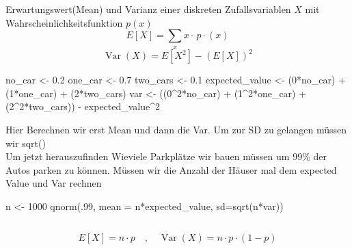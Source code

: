 \newpage


\section{}
\subsection{}
Erwartungswert(Mean) und Varianz einer diskreten Zufallsvariablen $X$ mit Wahrscheinlichkeitsfunktion $p(x)$
\large{
\[
E[X] = \sum_{x} x \cdot\, p\cdot(x)
\]
\[
\operatorname{Var}(X) = E\left[X^2\right] - \left(E\left[X\right]\right)^2
\]
}
\normalsize
\begin{rcode}{1}
no_car <- 0.2
one_car <- 0.7
two_cars <- 0.1
expected_value <- (0*no_car) + (1*one_car) + (2*two_cars)
var <- ((0^2*no_car) + (1^2*one_car) + (2^2*two_cars)) - expected_value^2  
\end{rcode}
Hier Berechnen wir erst Mean und dann die Var. Um zur SD zu gelangen müssen wir sqrt()\\
Um jetzt herauszufinden Wieviele Parkplätze wir bauen müssen um 99\% der Autos parken zu können. Müssen wir die Anzahl der Häuser mal dem expected Value und Var rechnen
\begin{rcode}{1}
n <- 1000
qnorm(.99, mean = n*expected_value, sd=sqrt(n*var))
\end{rcode}
\subsection{}
\large
\[
E[X] = n \cdot p \quad, \quad \operatorname{Var}(X) =n \cdot p \cdot (1-p)
\]
\subsection{}
\normalsize
\columnbreak
\section{}
